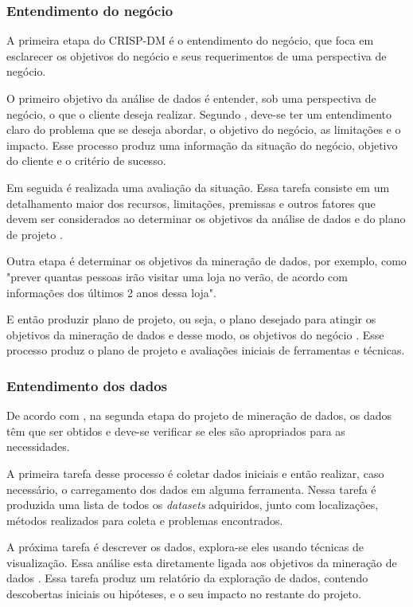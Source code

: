 \subsubsection{Entendimento do negócio}
A primeira etapa do CRISP-DM é o entendimento do negócio, que foca em esclarecer os objetivos do negócio e seus requerimentos de uma perspectiva de negócio.

O primeiro objetivo da análise de dados é entender, sob uma perspectiva de negócio, o que o cliente deseja realizar. Segundo , deve-se ter um entendimento claro do problema que se deseja abordar, o objetivo do negócio, as limitações e o impacto. Esse processo produz uma informação da situação do negócio, objetivo do cliente e o critério de sucesso.

Em seguida é realizada uma avaliação da situação. Essa tarefa consiste em um detalhamento maior dos recursos, limitações, premissas e outros fatores que devem ser considerados ao determinar os objetivos da análise de dados e do plano de projeto \citep{crispmanual}.

Outra etapa é determinar os objetivos da mineração de dados, por exemplo, como "prever quantas pessoas irão visitar uma loja no verão, de acordo com informações dos últimos 2 anos dessa loja".

E então produzir plano de projeto, ou seja, o plano desejado para atingir os objetivos da mineração de dados e desse modo, os objetivos do negócio \citep{crispmanual}. Esse processo produz o plano de projeto e avaliações iniciais de ferramentas e técnicas.

\subsubsection{Entendimento dos dados}
De acordo com , na segunda etapa do projeto de mineração de dados, os dados têm que ser obtidos e deve-se verificar se eles são apropriados para as necessidades.

A primeira tarefa desse processo é coletar dados iniciais e então realizar, caso necessário, o carregamento dos dados em alguma ferramenta. Nessa tarefa é produzida uma lista de todos os \textit{datasets} adquiridos, junto com localizações, métodos realizados para coleta e problemas encontrados.

A próxima tarefa é descrever os dados, explora-se eles usando técnicas de visualização. Essa análise esta diretamente ligada aos objetivos da mineração de dados \citep{crispmanual}. Essa tarefa produz um relatório da exploração de dados, contendo descobertas iniciais ou hipóteses, e o seu impacto no restante do projeto.

